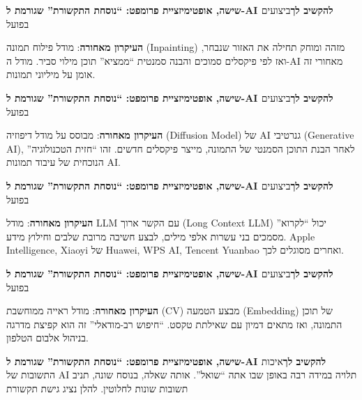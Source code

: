\textbf{שישה, אופטימיזציית פרומפט: “נוסחת התקשורת” שגורמת ל-AI להקשיב לך}ביצועים בפועל


\textbf{העיקרון מאחורה}: מודל פילוח תמונה (Inpainting) מזהה ומוחק תחילה את האזור שנבחר, ואז לפי פיקסלים סמוכים והבנה סמנטית “ממציא” תוכן מילוי סביר. מודל ה-AI מאחורי זה אומן על מיליוני תמונות.

\textbf{שישה, אופטימיזציית פרומפט: “נוסחת התקשורת” שגורמת ל-AI להקשיב לך}ביצועים בפועל


\textbf{העיקרון מאחורה}: מבוסס על מודל דיפוזיה (Diffusion Model) של AI גנרטיבי (Generative AI), לאחר הבנת התוכן הסמנטי של התמונה, מייצר פיקסלים חדשים. זהו “חזית הטכנולוגיה” הנוכחית של עיבוד תמונות AI.

\textbf{שישה, אופטימיזציית פרומפט: “נוסחת התקשורת” שגורמת ל-AI להקשיב לך}ביצועים בפועל


\textbf{העיקרון מאחורה}: מודל LLM עם הקשר ארוך (Long Context LLM) יכול “לקרוא” מסמכים בני עשרות אלפי מילים, לבצע חשיבה מרובת שלבים וחילוץ מידע. Apple Intelligence, Xiaoyi של Huawei, WPS AI, Tencent Yuanbao ואחרים מסוגלים לכך.

\textbf{שישה, אופטימיזציית פרומפט: “נוסחת התקשורת” שגורמת ל-AI להקשיב לך}ביצועים בפועל


\textbf{העיקרון מאחורה}: מודל ראייה ממוחשבת (CV) מבצע הטמעה (Embedding) של תוכן התמונה, ואז מתאים דמיון עם שאילתת טקסט. “חיפוש רב-מודאלי” זה הוא קפיצת מדרגה בניהול אלבום הטלפון.

\textbf{שישה, אופטימיזציית פרומפט: “נוסחת התקשורת” שגורמת ל-AI להקשיב לך}איכות התשובות של AI תלויה במידה רבה באופן שבו אתה “שואל”. אותה שאלה, בנוסח שונה, תניב תשובות שונות לחלוטין. להלן נציג גישת תקשורת

